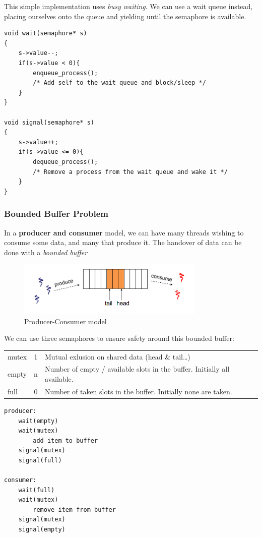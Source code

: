 \documentclass[a4]{article}
\begin{document}
This simple implementation uses \emph{busy waiting}. We can use a wait
queue instead, placing ourselves onto the queue and yielding until the
semaphore is available.

\begin{verbatim}
void wait(semaphore* s)
{
    s->value--;
    if(s->value < 0){
        enqueue_process();
        /* Add self to the wait queue and block/sleep */
    }
}

void signal(semaphore* s)
{
    s->value++;
    if(s->value <= 0){
        dequeue_process();
        /* Remove a process from the wait queue and wake it */
    }
}
\end{verbatim}

\subsubsection{Bounded Buffer Problem}\label{bounded-buffer-problem}

In a \textbf{producer and consumer} model, we can have many threads
wishing to consume some data, and many that produce it. The handover of
data can be done with a \emph{bounded buffer}

\begin{figure}[h!]
  \centering
  \includegraphics[width=0.8\textwidth]{produceConsume}
  \caption{Producer-Consumer model}
\end{figure}


We can use three semaphores to ensure safety around this bounded buffer:

\begin{tabular}{l | c | l }
mutex & 1 & Mutual exlusion on shared data (head \& tail\ldots{})\\
empty & n & Number of empty / available slots in the buffer. Initially all available.\\
full  & 0 & Number of taken slots in the buffer. Initially none are taken.
\end{tabular}

\begin{verbatim}
producer:
    wait(empty)
    wait(mutex)
        add item to buffer
    signal(mutex)
    signal(full)

consumer:
    wait(full)
    wait(mutex)
        remove item from buffer
    signal(mutex)
    signal(empty)
\end{verbatim}
\end{document}
